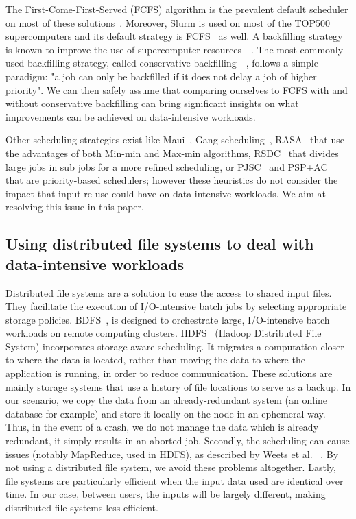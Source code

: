 \documentclass[conference]{IEEEtran}
\begin{document}
The First-Come-First-Served (FCFS) algorithm is the prevalent default
scheduler on most of these solutions~\cite{survey_workload_manager_and_scheduler}.
Moreover, Slurm is used on most of the TOP500 supercomputers and its default strategy is FCFS~\cite{slurm_website_scheduling} as well.
A backfilling strategy is known to improve
the use of supercomputer resources~\cite{maui}~\cite{New_Backfill}. 
The most commonly-used backfilling strategy, called conservative 
backfilling~\cite{Characterization_of_Backfilling}~\cite{Introducing-New-Backfill-based}, follows
a simple paradigm: "a job can only be backfilled if it does not
delay a job of higher priority".
We can then safely assume that comparing ourselves to FCFS with and without conservative backfilling can 
bring significant insights on what improvements can be achieved on data-intensive workloads.

Other scheduling strategies exist like 
Maui~\cite{Maui_Scheduler}, Gang scheduling~\cite{gang_scheduling}, 
RASA~\cite{rasa} that use the advantages of both Min-min and Max-min algorithms,
RSDC~\cite{rsdc} that divides large jobs in sub jobs for a more refined scheduling,
or PJSC~\cite{pjsc} and PSP+AC~\cite{PSP_AC} that are priority-based schedulers; 
however these heuristics do not consider the impact that
input re-use could have on data-intensive workloads.
We aim at resolving this issue in this paper.

\subsection{Using distributed file systems to deal with data-intensive workloads}

Distributed file systems are a solution to ease the access to 
shared input files.
They facilitate the execution of I/O-intensive batch
jobs by selecting appropriate storage policies.
BDFS~\cite{Explicit_Control_in_a_Batch-Aware_Distributed_File_System},
is designed to orchestrate large, I/O-intensive batch workloads on remote computing clusters.
HDFS~\cite{hdfs} (Hadoop Distributed File System)
incorporates storage-aware scheduling. 
It migrates a computation closer to where the data is
located, rather than moving the data to where the application is
running, in order to reduce communication.
These solutions are mainly storage systems that use a history of file locations to serve as a backup.
In our scenario, we copy the data from an already-redundant system (an online database for example)
and store it locally on the node in an ephemeral way.
Thus, in the event of a crash, we do not manage the data which is already redundant, it simply results in an aborted job.
Secondly, the scheduling can cause issues (notably MapReduce, used in HDFS), as described by Weets et al.
~\cite{issue_with_hdfs}.
By not using a distributed file system, we avoid these problems altogether.
Lastly, file systems are particularly efficient when the input data used are identical over time.
In our case, between users, the inputs will be largely different, making distributed file systems less efficient.
\end{document}
